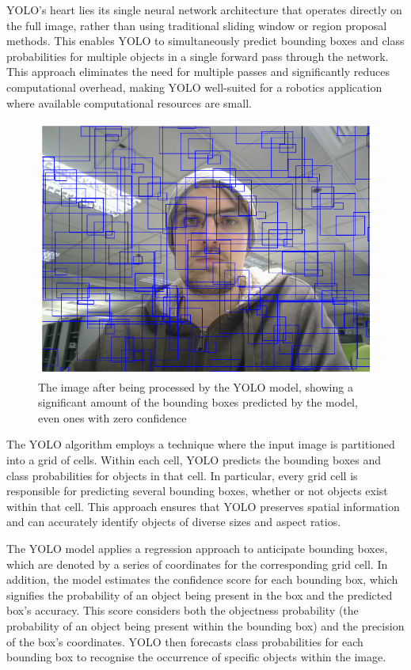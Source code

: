 YOLO's heart lies its single neural network architecture that operates directly on the full image, rather than using traditional sliding window or region proposal methods. This enables YOLO to simultaneously predict bounding boxes and class probabilities for multiple objects in a single forward pass through the network. This approach eliminates the need for multiple passes and significantly reduces computational overhead, making YOLO well-suited for a robotics application where available computational resources are small.

\begin{figure}[!htb]
    \centering{}
    \includegraphics[scale=0.35]{m+m_images/figure4_all_boxes_half_yolo.png}
    \caption{The image after being processed by the YOLO model, showing a significant amount of the bounding boxes predicted by the model, even ones with zero confidence}
    \label{figure:yoloallboxes}
\end{figure}

The YOLO algorithm employs a technique where the input image is partitioned into a grid of cells. Within each cell, YOLO predicts the bounding boxes and class probabilities for objects in that cell. In particular, every grid cell is responsible for predicting several bounding boxes, whether or not objects exist within that cell. This approach ensures that YOLO preserves spatial information and can accurately identify objects of diverse sizes and aspect ratios.

The YOLO model applies a regression approach to anticipate bounding boxes, which are denoted by a series of coordinates for the corresponding grid cell. In addition, the model estimates the confidence score for each bounding box, which signifies the probability of an object being present in the box and the predicted box's accuracy. This score considers both the objectness probability (the probability of an object being present within the bounding box) and the precision of the box's coordinates. YOLO then forecasts class probabilities for each bounding box to recognise the occurrence of specific objects within the image. \cite{Redmon2015-eb}

